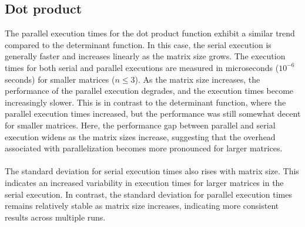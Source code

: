 \subsection{Dot product}
The parallel execution times for the dot product function exhibit a similar trend compared to the determinant function. In this case, the serial execution is generally faster and increases linearly as the matrix size grows. The execution times for both serial and parallel executions are measured in microseconds ($10^{-6}$ seconds) for smaller matrices ($n \le 3$). As the matrix size increases, the performance of the parallel execution degrades, and the execution times become increasingly slower. This is in contrast to the determinant function, where the parallel execution times increased, but the performance was still somewhat decent for smaller matrices. Here, the performance gap between parallel and serial execution widens as the matrix sizes increase, suggesting that the overhead associated with parallelization becomes more pronounced for larger matrices.
\\\\
The standard deviation for serial execution times also rises with matrix size. This indicates an increased variability in execution times for larger matrices in the serial execution. In contrast, the standard deviation for parallel execution times remains relatively stable as matrix size increases, indicating more consistent results across multiple runs.
